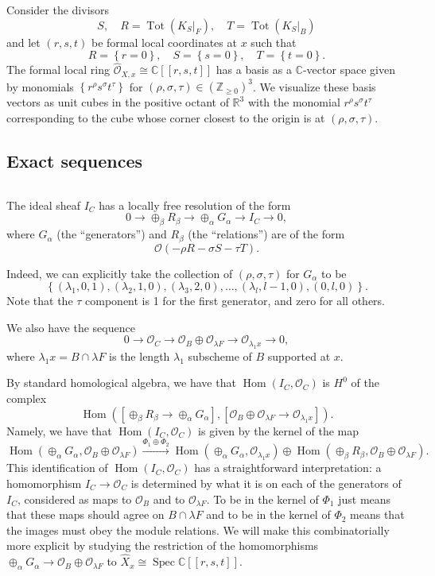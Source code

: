 \documentclass[12pt]{amsart}
\theoremstyle{definition}
\newcommand{\CC} {\mathbb{C}}          %
\newcommand{\RR} {\mathbb{R}}		%
\newcommand{\ZZ} {\mathbb{Z}}		%
\renewcommand{\O}{\mathcal{O}}
\newcommand{\Hom}{\operatorname{Hom}}
\newcommand{\Tot}{\operatorname{Tot}}
\newcommand{\Spec}{\operatorname{Spec}}
\newcommand{\SubSecSpace}{$\,$\vspace{0.2cm}\par } %
\begin{document}
Consider the divisors
\[
S,\quad R=\Tot (K_{S}|_{F}),\quad T=\Tot (K_{S}|_{B})
\]
and let $(r,s,t)$ be formal local coordinates at $x$ such that 
\[
R=\left\{r=0 \right\},\quad S=\left\{s=0 \right\},\quad T=\left\{t=0 \right\}.
\]
The formal local ring $\widehat{\O}_{X,x}\cong \CC [[r,s,t]]$ has a basis
as a $\CC$-vector space given by monomials
$\left\{r^{\rho}s^{\sigma}t^{\tau} \right\}$ for $(\rho, \sigma,
\tau)\in \left(\ZZ_{\geq 0} \right)^{3}$. We visualize these basis
vectors as unit cubes in the positive octant of $\RR^{3}$ with the
monomial $r^{\rho}s^{\sigma}t^{\tau}$ corresponding to the cube whose
corner closest to the origin is at $(\rho ,\sigma ,\tau)$.


\subsection{Exact sequences}\SubSecSpace 

The ideal sheaf $I_{C}$ has a locally free resolution of the form
\begin{equation}\label{eqn: R-->G-->I_C exact sequence}
0\to \oplus_{\beta}R_{\beta} \to \oplus_{\alpha }G_{\alpha } \to I_{C}
\to 0,
\end{equation}
where $G_{\alpha}$ (the ``generators'') and $R_{\beta}$ (the
``relations'') are of the form 
\[
\O (-\rho R-\sigma S-\tau T).
\]

Indeed, we can explicitly take the collection of $(\rho ,\sigma
,\tau)$ for $G_{\alpha}$ to be 
\[
\left\{(\lambda_{1},0,1),(\lambda_{2},1,0),(\lambda_{3},2,0),\dotsc
,(\lambda_{l},l-1,0),(0,l,0) \right\}.
\]
Note that the $\tau$ component is 1 for the first generator, and zero
for all others.

We also have the sequence
\[
0\to \O_{C} \to \O_{B}\oplus\O_{\lambda F}\to \O_{\lambda_{1}x}\to 0,
\]
where $\lambda_{1}x=B\cap \lambda F$ is the length $\lambda_{1}$
subscheme of $B$ supported at $x$.

By standard homological algebra, we have that $\Hom (I_{C},\O_{C})$ is
$H^{0}$ of the complex
\[
\Hom \left(\left[\oplus_{\beta}R_{\beta}\to
\oplus_{\alpha}G_{\alpha} \right],[\O_{B}\oplus \O_{\lambda F}\to
\O_{\lambda_{1}x}] \right).
\]
Namely, we have that $\Hom (I_{C},\O_{C})$ is given by the kernel of
the map
\[
\Hom (\oplus_{\alpha}G_{\alpha},\O_{B}\oplus \O_{\lambda
F}) \xrightarrow{\Phi_{1}\oplus \Phi_{2}}
\Hom(\oplus_{\alpha}G_{\alpha},\O_{\lambda_{1}x})\oplus \Hom
(\oplus_{\beta}R_{\beta},\O_{B}\oplus \O_{\lambda F}).
\]
This identification of $\Hom (I_{C},\O_{C})$ has a straightforward
interpretation: a homomorphism $I_{C}\to \O_C$ is determined by what
it is on each of the generators of $I_{C}$, considered as maps to
$\O_{B}$ and to $\O_{\lambda F}$. To be in the kernel of $\Phi_{1}$
just means that these maps should agree on $B\cap \lambda F$ and to be
in the kernel of $\Phi_{2}$ means that the images must obey the module
relations. We will make this combinatorially more explicit by studying
the restriction of the homomorphisms $\oplus_{\alpha}G_{\alpha}\to
\O_{B}\oplus \O_{\lambda F}$ to $\widehat{X}_{x}\cong \Spec \CC
[[r,s,t]]$.
\end{document}
